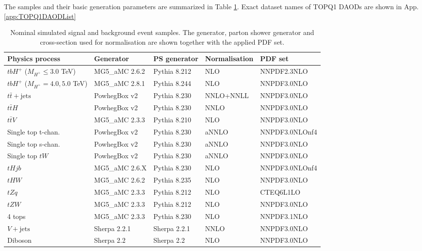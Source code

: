 The samples and their basic generation parameters are summarized in Table \ref{tab:SampleSummary}. Exact dataset names of TOPQ1 DAODs are shown in App. \ref{app:TOPQ1DAODList}

\begin{table}[H]
  \centering
  \begin{tabular*}{160mm}{@{\extracolsep{\fill}}lllll}
    \hline\hline
    Physics process & Generator & PS generator & Normalisation & PDF set\\
    \hline
    $tbH^{+}$ ($M_{H^{+}}\leq3.0$ TeV)  & MG5\_aMC 2.6.2 & Pythia 8.212 & NLO & NNPDF2.3NLO\\
    $tbH^{+}$ ($M_{H^{+}}=4.0,5.0$ TeV) & MG5\_aMC 2.8.1 & Pythia 8.244 & NLO & NNPDF3.0NLO\\
    \hline
    $t\bar{t}+\text{jets}$ & PowhegBox v2   & Pythia 8.230 & NNLO+NNLL & NNPDF3.0NLO\\
    $t\bar{t}H$            & PowhegBox v2   & Pythia 8.230 & NNLO      & NNPDF3.0NLO\\
    $t\bar{t}V$            & MG5\_aMC 2.3.3 & Pythia 8.210 & NLO       & NNPDF3.0NLO\\
    \hline
    Single top t-chan. & PowhegBox v2 & Pythia 8.230 & aNNLO & NNPDF3.0NLOnf4\\
    Single top s-chan. & PowhegBox v2 & Pythia 8.230 & aNNLO & NNPDF3.0NLO\\
    Single top $tW$    & PowhegBox v2 & Pythia 8.230 & aNNLO & NNPDF3.0NLO\\
    \hline
    $tHjb$ & MG5\_aMC 2.6.X & Pythia 8.230 & NLO & NNPDF3.0NLOnf4\\
    $tHW$  & MG5\_aMC 2.6.2 & Pythia 8.235 & NLO & NNPDF3.0NLO\\
    $tZq$  & MG5\_aMC 2.3.3 & Pythia 8.212 & NLO & CTEQ6L1LO\\
    $tZW$  & MG5\_aMC 2.3.3 & Pythia 8.212 & NLO & NNPDF3.0NLO\\
    4 tops & MG5\_aMC 2.3.3 & Pythia 8.230 & NLO & NNPDF3.1NLO\\
    \hline
    $V+\text{jets}$ & Sherpa 2.2.1 & Sherpa 2.2.1 & NNLO & NNPDF3.0NLO\\
    Diboson         & Sherpa 2.2   & Sherpa 2.2   & NLO  & NNPDF3.0NLO\\
    \hline\hline
  \end{tabular*}
  \caption{Nominal simulated signal and background event samples. The generator, parton shower generator and cross-section used for normalisation are shown together with the applied PDF set.}
  \label{tab:SampleSummary}
\end{table}